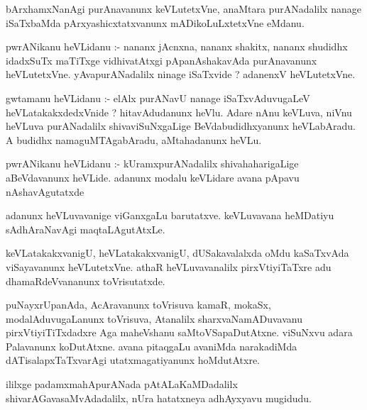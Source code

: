 \documentclass{article}
\begin{document}
\begin{mn}
bArxhamxNanAgi  purAnavanunx  keVLutetxVne,  anaMtara  purANadalilx  nanage  iSaTxbaMda  pArxyashicxtatxvanunx  
mADikoLuLxtetxVne  eMdanu.
\end{mn}

\begin{mn}
pwrANikanu  heVLidanu :-  nananx  jAcnxna,  nananx  shakitx,  nananx  shudidhx  idadxSuTx  maTiTxge  vidhivatAtxgi  
pApanAshakavAda  purAnavanunx  heVLutetxVne.  yAvapurANadalilx  ninage  iSaTxvide ?  adanenxV  heVLutetxVne.
\end{mn}

\begin{mn}
gwtamanu  heVLidanu :-  elAlx  purANavU  nanage  iSaTxvAduvugaLeV  heVLatakakxdedxVnide ?  hitavAdudanunx  heVlu.  
Adare  nAnu  keVLuva,  niVnu  heVLuva  purANadalilx  shivaviSuNxgaLige  BeVdabudidhxyanunx  heVLabAradu.  A  
budidhx  namaguMTAgabAradu,  aMtahadanunx  heVLu.
\end{mn}

\begin{mn}
pwrANikanu  heVLidanu :- kUramxpurANadalilx  shivahaharigaLige  aBeVdavanunx  heVLide.  adanunx  modalu  
keVLidare  avana  pApavu  nAshavAgutatxde
\end{mn}

\begin{mn}
adanunx  heVLuvavanige  viGanxgaLu  barutatxve.  keVLuvavana  heMDatiyu    sAdhAraNavAgi  maqtaLAgutAtxLe.
\end{mn}

\begin{mn}
keVLatakakxvanigU,  heVLatakakxvanigU,  dUSakavalalxda  oMdu  kaSaTxvAda  viSayavanunx  heVLutetxVne.  athaR  
heVLuvavanalilx  pirxVtiyiTaTxre  adu  dhamaRdeVvananunx  toVrisutatxde.
\end{mn}

\begin{mn}
puNayxrUpanAda,  AcAravanunx  toVrisuva  kamaR,  mokaSx,  modalAduvugaLanunx  toVrisuva,  Atanalilx  
sharxvaNamADuvavanu  pirxVtiyiTiTxdadxre  Aga  maheVshanu  saMtoVSapaDutAtxne.  viSuNxvu  adara  Palavanunx  
koDutAtxne.  avana  pitaqgaLu  avaniMda  narakadiMda  dATisalapxTaTxvarAgi  utatxmagatiyanunx  hoMdutAtxre.
\end{mn}

\begin{mn}
ililxge  padamxmahApurANada  pAtALaKaMDadalilx  shivarAGavasaMvAdadalilx,  nUra  hatatxneya  adhAyxyavu  mugidudu.
\end{mn}
\end{document}

